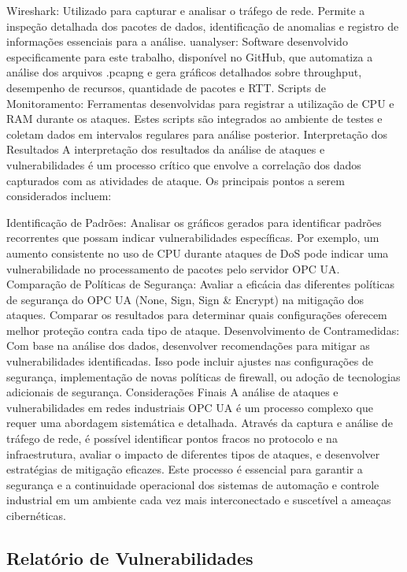 {    Wireshark: Utilizado para capturar e analisar o tráfego de rede. Permite a inspeção detalhada dos pacotes de dados, identificação de anomalias e registro de informações essenciais para a análise.
    uanalyser: Software desenvolvido especificamente para este trabalho, disponível no GitHub, que automatiza a análise dos arquivos .pcapng e gera gráficos detalhados sobre throughput, desempenho de recursos, quantidade de pacotes e RTT.
    Scripts de Monitoramento: Ferramentas desenvolvidas para registrar a utilização de CPU e RAM durante os ataques. Estes scripts são integrados ao ambiente de testes e coletam dados em intervalos regulares para análise posterior.
    Interpretação dos Resultados
    A interpretação dos resultados da análise de ataques e vulnerabilidades é um processo crítico que envolve a correlação dos dados capturados com as atividades de ataque. Os principais pontos a serem considerados incluem:

    Identificação de Padrões: Analisar os gráficos gerados para identificar padrões recorrentes que possam indicar vulnerabilidades específicas. Por exemplo, um aumento consistente no uso de CPU durante ataques de DoS pode indicar uma vulnerabilidade no processamento de pacotes pelo servidor OPC UA.
    Comparação de Políticas de Segurança: Avaliar a eficácia das diferentes políticas de segurança do OPC UA (None, Sign, Sign \& Encrypt) na mitigação dos ataques. Comparar os resultados para determinar quais configurações oferecem melhor proteção contra cada tipo de ataque.
    Desenvolvimento de Contramedidas: Com base na análise dos dados, desenvolver recomendações para mitigar as vulnerabilidades identificadas. Isso pode incluir ajustes nas configurações de segurança, implementação de novas políticas de firewall, ou adoção de tecnologias adicionais de segurança.
    Considerações Finais
    A análise de ataques e vulnerabilidades em redes industriais OPC UA é um processo complexo que requer uma abordagem sistemática e detalhada. Através da captura e análise de tráfego de rede, é possível identificar pontos fracos no protocolo e na infraestrutura, avaliar o impacto de diferentes tipos de ataques, e desenvolver estratégias de mitigação eficazes. Este processo é essencial para garantir a segurança e a continuidade operacional dos sistemas de automação e controle industrial em um ambiente cada vez mais interconectado e suscetível a ameaças cibernéticas.
    }

    \subsection{Relatório de Vulnerabilidades}

